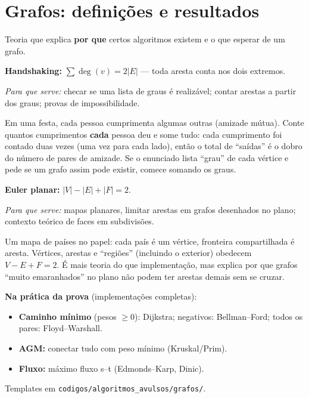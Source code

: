 \section{Grafos: definições e resultados}

Teoria que explica \textbf{por que} certos algoritmos existem e o que esperar de um grafo.

\textbf{Handshaking:} $\sum \deg(v) = 2|E|$ --- toda aresta conta nos dois extremos.

\emph{Para que serve:} checar se uma lista de graus é realizável; contar arestas a partir dos graus; provas de impossibilidade.

\begin{exemplodiabox}
Em uma festa, cada pessoa cumprimenta algumas outras (amizade mútua). Conte quantos cumprimentos \textbf{cada} pessoa deu e some tudo: cada cumprimento foi contado duas vezes (uma vez para cada lado), então o total de ``saídas'' é o dobro do número de pares de amizade. Se o enunciado lista ``grau'' de cada vértice e pede se um grafo assim pode existir, comece somando os graus.
\end{exemplodiabox}



\textbf{Euler planar:} $|V| - |E| + |F| = 2$.

\emph{Para que serve:} mapas planares, limitar arestas em grafos desenhados no plano; contexto teórico de faces em subdivisões.

\begin{exemplodiabox}
Um mapa de países no papel: cada país é um vértice, fronteira compartilhada é aresta. Vértices, arestas e ``regiões'' (incluindo o exterior) obedecem $V - E + F = 2$. É mais teoria do que implementação, mas explica por que grafos ``muito emaranhados'' no plano não podem ter arestas demais sem se cruzar.
\end{exemplodiabox}



\textbf{Na prática da prova} (implementações completas):
\begin{itemize}
  \item \textbf{Caminho mínimo} (pesos $\ge 0$): Dijkstra; negativos: Bellman--Ford; todos os pares: Floyd--Warshall.
  \item \textbf{AGM:} conectar tudo com peso mínimo (Kruskal/Prim).
  \item \textbf{Fluxo:} máximo fluxo s--t (Edmonds--Karp, Dinic).
\end{itemize}
Templates em \texttt{codigos/algoritmos\_avulsos/grafos/}.

